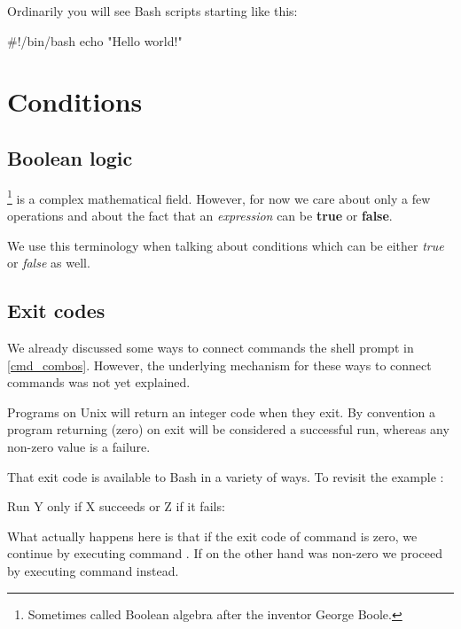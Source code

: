 \documentclass{olli-handout}
\begin{document}
Ordinarily you will see Bash scripts starting like this:

\begin{lstbash}
#!/bin/bash
echo "Hello world!"
\end{lstbash}

\section{Conditions}

\begin{refmanbash}
\end{refmanbash}

\subsection{Boolean logic}

\footnote{Sometimes called Boolean algebra after the inventor George Boole.} is a complex mathematical field. However, for now we care about only a few operations and about the fact that an \emph{expression} can be \textbf{true} or \textbf{false}.

We use this terminology when talking about conditions which can be either \emph{true} or \emph{false} as well.

\subsection{Exit codes}

We already discussed some ways to connect commands the shell prompt in \vref{cmd_combos}. However, the underlying mechanism for these ways to connect commands was not yet explained.

Programs on Unix will return an integer code when they exit. By convention a program returning  (zero) on exit will be considered a successful run, whereas any non-zero value is a failure.

That exit code is available to Bash in a variety of ways. To revisit the example :

\begin{description}
    \item[Run Y only if X succeeds or Z if it fails:] 
\end{description}

What actually happens here is that if the exit code of command  is zero, we continue by executing command . If on the other hand  was non-zero we proceed by executing command  instead.
\end{document}
